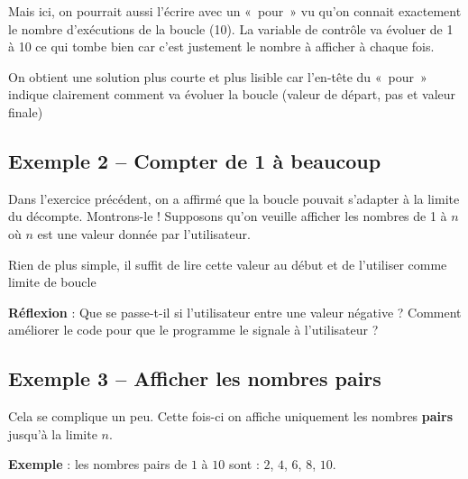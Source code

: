 		Mais ici, on pourrait aussi l'écrire avec un «~pour~» vu qu'on
		connait exactement le nombre d'exécutions de la boucle (10). 
		La variable de contrôle va évoluer de 1 à 10 ce qui tombe bien car
		c'est justement le nombre à afficher à chaque fois.


		On obtient une solution plus courte et plus lisible 
		car l'en-tête du «~pour~» indique clairement
		comment va évoluer la boucle
		(valeur de départ, pas et valeur finale)

	\subsection{Exemple 2 -- Compter de 1 à beaucoup}

		Dans l'exercice précédent, on a
		affirmé que la boucle pouvait s'adapter à la limite du
		décompte. Montrons-le ! Supposons qu'on veuille
		afficher les nombres de 1 à $n$ où $n$ est une valeur 
		donnée par l'utilisateur.

		Rien de plus simple, il suffit de lire cette
		valeur au début et de l'utiliser comme limite de boucle


		\textbf{Réflexion} : Que se passe-t-il si l'utilisateur entre une valeur négative ?
		Comment améliorer le code pour que le programme
		le signale à l'utilisateur ?

	\subsection{Exemple 3 -- Afficher les nombres pairs}

		Cela se complique un peu. Cette fois-ci on
		affiche uniquement les nombres \textbf{pairs} jusqu'à la limite $n$.
		
		\textbf{Exemple} : 
		les nombres pairs de $1$ à $10$ sont : $2$, $4$, $6$, $8$, $10$.
		
